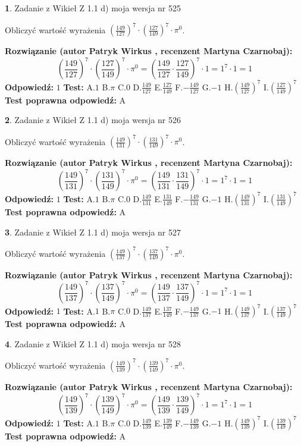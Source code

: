 \documentclass[12pt, a4paper]{article}
\theoremstyle{definition} %
\newtheorem{zad}{}
\newcommand{\zadStart}[1]{\begin{zad}#1\newline}
\newcommand{\zadStop}{\end{zad}}
\newcommand{\rozwStart}[2]{\noindent \textbf{Rozwiązanie (autor #1 , recenzent #2): }\newline}
\newcommand{\rozwStop}{\newline}
\newcommand{\odpStart}{\noindent \textbf{Odpowiedź:}\newline}
\newcommand{\odpStop}{\newline}
\newcommand{\testStart}{\noindent \textbf{Test:}\newline}
\newcommand{\testStop}{\newline}
\newcommand{\kluczStart}{\noindent \textbf{Test poprawna odpowiedź:}\newline}
\newcommand{\kluczStop}{\newline}
\begin{document}
\zadStart{Zadanie z Wikieł Z 1.1 d) moja wersja nr 525}

Obliczyć wartość wyrażenia $(\frac{149}{127})^{7} \cdot (\frac{127}{149})^{7} \cdot \pi^{0}$.
\zadStop
\rozwStart{Patryk Wirkus}{Martyna Czarnobaj}
$$(\frac{149}{127})^{7} \cdot (\frac{127}{149})^{7} \cdot \pi^{0} = (\frac{149}{127} \cdot \frac{127}{149})^{7} \cdot 1 = 1^{7} \cdot 1 = 1$$
\rozwStop
\odpStart
$1$
\odpStop
\testStart
A.$1$ B.$\pi$ C.$0$ D.$\frac{149}{127}$ E.$\frac{127}{149}$
F.$-\frac{149}{127}$ G.$-1$
H.$(\frac{149}{127})^{7}$
I.$(\frac{127}{149})^{7}$
\testStop
\kluczStart
A
\kluczStop



\zadStart{Zadanie z Wikieł Z 1.1 d) moja wersja nr 526}

Obliczyć wartość wyrażenia $(\frac{149}{131})^{7} \cdot (\frac{131}{149})^{7} \cdot \pi^{0}$.
\zadStop
\rozwStart{Patryk Wirkus}{Martyna Czarnobaj}
$$(\frac{149}{131})^{7} \cdot (\frac{131}{149})^{7} \cdot \pi^{0} = (\frac{149}{131} \cdot \frac{131}{149})^{7} \cdot 1 = 1^{7} \cdot 1 = 1$$
\rozwStop
\odpStart
$1$
\odpStop
\testStart
A.$1$ B.$\pi$ C.$0$ D.$\frac{149}{131}$ E.$\frac{131}{149}$
F.$-\frac{149}{131}$ G.$-1$
H.$(\frac{149}{131})^{7}$
I.$(\frac{131}{149})^{7}$
\testStop
\kluczStart
A
\kluczStop



\zadStart{Zadanie z Wikieł Z 1.1 d) moja wersja nr 527}

Obliczyć wartość wyrażenia $(\frac{149}{137})^{7} \cdot (\frac{137}{149})^{7} \cdot \pi^{0}$.
\zadStop
\rozwStart{Patryk Wirkus}{Martyna Czarnobaj}
$$(\frac{149}{137})^{7} \cdot (\frac{137}{149})^{7} \cdot \pi^{0} = (\frac{149}{137} \cdot \frac{137}{149})^{7} \cdot 1 = 1^{7} \cdot 1 = 1$$
\rozwStop
\odpStart
$1$
\odpStop
\testStart
A.$1$ B.$\pi$ C.$0$ D.$\frac{149}{137}$ E.$\frac{137}{149}$
F.$-\frac{149}{137}$ G.$-1$
H.$(\frac{149}{137})^{7}$
I.$(\frac{137}{149})^{7}$
\testStop
\kluczStart
A
\kluczStop



\zadStart{Zadanie z Wikieł Z 1.1 d) moja wersja nr 528}

Obliczyć wartość wyrażenia $(\frac{149}{139})^{7} \cdot (\frac{139}{149})^{7} \cdot \pi^{0}$.
\zadStop
\rozwStart{Patryk Wirkus}{Martyna Czarnobaj}
$$(\frac{149}{139})^{7} \cdot (\frac{139}{149})^{7} \cdot \pi^{0} = (\frac{149}{139} \cdot \frac{139}{149})^{7} \cdot 1 = 1^{7} \cdot 1 = 1$$
\rozwStop
\odpStart
$1$
\odpStop
\testStart
A.$1$ B.$\pi$ C.$0$ D.$\frac{149}{139}$ E.$\frac{139}{149}$
F.$-\frac{149}{139}$ G.$-1$
H.$(\frac{149}{139})^{7}$
I.$(\frac{139}{149})^{7}$
\testStop
\kluczStart
A
\kluczStop
\end{document}
